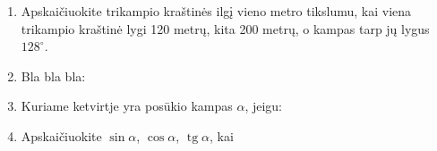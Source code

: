\documentclass[a4paper]{article}
\DeclareMathOperator{\tg}{tg}
\begin{document}
\begin{enumerate}


      \item Apskaičiuokite trikampio kraštinės ilgį vieno metro tikslumu, kai
            viena trikampio kraštinė lygi 120 metrų, kita 200 metrų, o kampas
            tarp jų lygus
            $128^\circ$.

      \item Bla bla bla:

      \item Kuriame ketvirtje yra posūkio kampas $\alpha$, jeigu:

      \item Apskaičiuokite $\sin \alpha$, $\cos \alpha$, $\tg \alpha$, kai

\end{enumerate}
\end{document}
